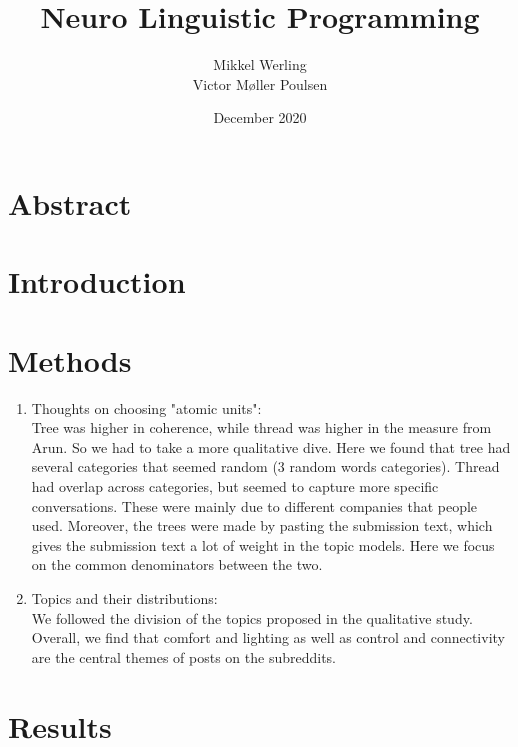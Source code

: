 \documentclass{article}
\title{Neuro Linguistic Programming}
\author{Mikkel Werling \\ Victor Møller Poulsen}
\date{December 2020}
\begin{document}
    \maketitle
    \section{Abstract}
    \section{Introduction}
    \section{Methods}
    \begin{enumerate}
        \item Thoughts on choosing "atomic units":\\
        Tree was higher in coherence, while thread was higher in the measure from Arun. So we had to take a more qualitative dive. Here we found that tree had several categories that seemed random (3 random words categories). Thread had overlap across categories, but seemed to capture more specific conversations. These were mainly due to different companies that people used. Moreover, the trees were made by pasting the submission text, which gives the submission text a lot of weight in the topic models. Here we focus on the common denominators between the two. 
        \item Topics and their distributions: \\
        We followed the division of the topics proposed in the qualitative study. Overall, we find that comfort and lighting as well as control and connectivity are the central themes of posts on the subreddits. 
    \end{enumerate}
    \section{Results}
\end{document}
